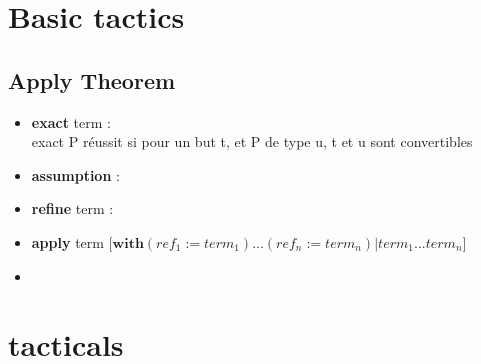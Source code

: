 \documentclass[a4paper, 10pt]{article}
\begin{document}
\setlength{\grammarparsep}{15pt plus 1pt minus 1pt} %
\setlength{\grammarindent}{7em} %
\renewcommand{\syntleft}{}
\renewcommand{\syntright}{}



\section {Basic tactics}
\subsection{Apply Theorem}
\begin{itemize}
\item \textbf{exact} term :\\
  exact P réussit si pour un but t, et P de type u, t et u sont convertibles
\item \textbf{assumption} :
  
\item  \textbf{refine} term :

\item \textbf{apply} term $[\textbf{with} (ref_1 := term_1)$...$(ref_n :=
  term_n) | term_1 $...$ term_n]$

\item  

\end{itemize}




\newpage
\section{tacticals}
\end{document}
